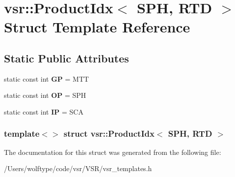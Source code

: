 \hypertarget{structvsr_1_1_product_idx_3_01_s_p_h_00_01_r_t_d_01_4}{\section{vsr\-:\-:Product\-Idx$<$ S\-P\-H, R\-T\-D $>$ Struct Template Reference}
\label{structvsr_1_1_product_idx_3_01_s_p_h_00_01_r_t_d_01_4}
}
\subsection*{Static Public Attributes}
\begin{DoxyCompactItemize}
\item 
\hypertarget{structvsr_1_1_product_idx_3_01_s_p_h_00_01_r_t_d_01_4_ad14e5f5f496e8dbd4af47fe788327d83}{static const int {\bfseries G\-P} = M\-T\-T}\label{structvsr_1_1_product_idx_3_01_s_p_h_00_01_r_t_d_01_4_ad14e5f5f496e8dbd4af47fe788327d83}

\item 
\hypertarget{structvsr_1_1_product_idx_3_01_s_p_h_00_01_r_t_d_01_4_ab71d5b8a31a697ccbfcc247033544978}{static const int {\bfseries O\-P} = S\-P\-H}\label{structvsr_1_1_product_idx_3_01_s_p_h_00_01_r_t_d_01_4_ab71d5b8a31a697ccbfcc247033544978}

\item 
\hypertarget{structvsr_1_1_product_idx_3_01_s_p_h_00_01_r_t_d_01_4_a3e0d906909b283741c8ce7ae1d3bce97}{static const int {\bfseries I\-P} = S\-C\-A}\label{structvsr_1_1_product_idx_3_01_s_p_h_00_01_r_t_d_01_4_a3e0d906909b283741c8ce7ae1d3bce97}

\end{DoxyCompactItemize}
\subsubsection*{template$<$$>$ struct vsr\-::\-Product\-Idx$<$ S\-P\-H, R\-T\-D $>$}



The documentation for this struct was generated from the following file\-:\begin{DoxyCompactItemize}
\item 
/\-Users/wolftype/code/vsr/\-V\-S\-R/vsr\-\_\-templates.\-h\end{DoxyCompactItemize}
